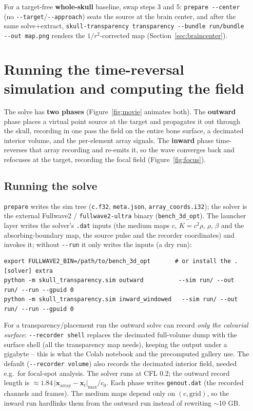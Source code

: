\documentclass[10pt]{article}
\newcommand{\code}[1]{\lstinline[basicstyle=\ttfamily]|#1|}
\begin{document}
For a target-free \textbf{whole-skull} baseline, swap steps 3 and 5: \code{prepare --center}
(no \code{--target}/\code{--approach}) seats the source at the brain center, and after the
same solve+extract, \code{skull-transparency transparency --bundle run/bundle --out map.png}
renders the $1/r^2$-corrected map (Section~\ref{sec:braincenter}).

\section{Running the time-reversal simulation and computing the field}\label{sec:sim}

The solve has \textbf{two phases} (Figure~\ref{fig:movie} animates both). The
\textbf{outward} phase places a virtual point source at the target and propagates it out
through the skull, recording in one pass the field on the entire bone surface, a
decimated interior volume, and the per-element array signals. The \textbf{inward} phase
time-reverses that array recording and re-emits it, so the wave converges back and
refocuses at the target, recording the focal field (Figure~\ref{fig:focus}).

\subsection{Running the solve}

\code{prepare} writes the sim tree (\code{c.f32}, \code{meta.json},
\code{array_coords.i32}); the solver is the external Fullwave2 / \code{fullwave2-ultra}
binary (\code{bench_3d_opt}). The launcher layer writes the solver's \code{.dat} inputs
(the medium maps $c$, $K=c^2\rho$, $\rho$, $\beta$ and the absorbing-boundary map, the
source pulse and the recorder coordinates) and invokes it; without \code{--run} it only
writes the inputs (a dry run):
\begin{lstlisting}[style=sh]
export FULLWAVE2_BIN=/path/to/bench_3d_opt       # or install the .[solver] extra
python -m skull_transparency.sim outward          --sim run/ --out run/ --run --gpuid 0
python -m skull_transparency.sim inward_windowed   --sim run/ --out run/ --run --gpuid 0
\end{lstlisting}
For a transparency/placement run the outward solve can record \emph{only the calvarial
surface}: \code{--recorder shell} replaces the decimated full-volume dump with the
surface shell (all the transparency map needs), keeping the output under a gigabyte --
this is what the Colab notebook and the precomputed gallery use. The default
(\code{--recorder volume}) also records the decimated interior field, needed e.g.\ for
focal-spot analysis. The solver runs at CFL $0.2$; the outward record length is
$\approx 1.84\,\lvert\mathbf{x}_\mathrm{array}-\mathbf{x}_t\rvert_{\max}/c_0$. Each phase
writes \code{genout.dat} (the recorded channels and frames). The medium maps depend only
on $(c,\text{grid})$, so the inward run hardlinks them from the outward run instead of
rewriting $\sim$10 GB.
\end{document}
